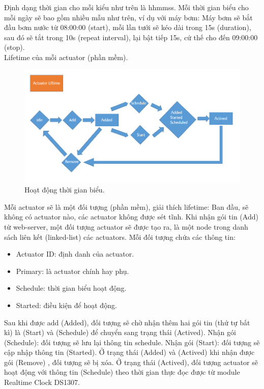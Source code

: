 \documentclass[a4paper,12pt,oneside]{article}
\begin{document}
\noindent Định dạng thời gian cho mỗi kiểu như trên là hhmmss. Mỗi thời gian biểu cho mỗi ngày sẽ bao gồm nhiều mẫu như trên, ví dụ với máy bơm: Máy bơm sẽ bắt đầu bơm nước từ 08:00:00 (start), mỗi lần tưới sẽ kéo dài trong 15s (duration), sau đó sẽ tắt trong 10s (repeat interval), lại bật tiếp 15s, cứ thế cho đến 09:00:00 (stop).\\
\noindent Lifetime của mỗi actuator (phần mềm).
\begin{center}
\begin{figure}[h!]
\begin{center}
\includegraphics[scale=0.7]{hinh/actuator_lifetime.PNG}
\end{center}
\caption{Hoạt động thời gian biểu.}
\end{figure}
\end{center}
\noindent Mỗi actuator sẽ là một đối tượng (phần mềm), giải thích lifetime: Ban đầu, sẽ không có actuator nào, các actuator không được sét tĩnh. Khi nhận gói tin (Add) từ web-server, một đối tượng actuator sẽ được tạo ra, là một node trong danh sách liên kết (linked-list) các actuators. Mỗi đối tượng chứa các thông tin:
\begin{itemize}
\item Actuator ID: định danh của actuator.
\item Primary: là actuator chính hay phụ.
\item Schedule: thời gian biểu hoạt động.
\item Started: điều kiện để hoạt động.
\end{itemize}
Sau khi được add (Added), đối tượng sẽ chờ nhận thêm hai gói tin (thứ tự bất kì) là (Start) và (Schedule) để chuyển sang trạng thái (Actived). Nhận gói (Schedule): đối tượng sẽ lưu lại thông tin schedule. Nhận gói (Start): đối tượng sẽ cập nhập thông tin (Started). Ở trạng thái (Added) và (Actived) khi nhận được gói (Remove) , đối tượng sẽ bị xóa. Ở trạng thái (Actived), đối tượng actuator sẽ hoạt động với thông tin (Schedule) theo thời gian thực đọc được từ module Realtime Clock DS1307.
\end{document}
